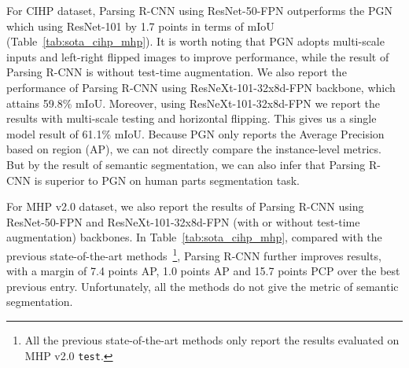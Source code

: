 \documentclass[10pt,twocolumn,letterpaper]{article}
\begin{document}
For CIHP dataset, Parsing R-CNN using ResNet-50-FPN outperforms the PGN~\cite{Gong_eccv2018_pgn} which using ResNet-101 by 1.7 points in terms of mIoU (Table~\ref{tab:sota_cihp_mhp}). It is worth noting that PGN adopts multi-scale inputs and left-right flipped images to improve performance, while the result of Parsing R-CNN is without test-time augmentation. We also report the performance of Parsing R-CNN using ResNeXt-101-32x8d-FPN backbone, which attains 59.8\% mIoU. Moreover, using ResNeXt-101-32x8d-FPN we report the results with multi-scale testing and horizontal flipping. This gives us a single model result of 61.1\% mIoU. Because PGN only reports the Average Precision based on region (AP), we can not directly compare the instance-level metrics. But by the result of semantic segmentation, we can also infer that Parsing R-CNN is superior to PGN on human parts segmentation task.

For MHP v2.0 dataset, we also report the results of Parsing R-CNN using ResNet-50-FPN and ResNeXt-101-32x8d-FPN (with or without test-time augmentation) backbones. In Table~\ref{tab:sota_cihp_mhp}, compared with the previous state-of-the-art methods~\cite{He_iccv2017_maskrcnn, Li_arxiv2017_mhparser, Zhao_mm2018_mhpv2}\footnote{\fontsize{7pt}{1em}All the previous state-of-the-art methods only report the results evaluated on MHP v2.0 \texttt{test}.}, Parsing R-CNN further improves results, with a margin of 7.4 points AP, 1.0 points AP and 15.7 points PCP over the best previous entry. Unfortunately, all the methods do not give the metric of semantic segmentation.





\begin{table}[t]
\centering
\small
{}
\vspace{.5em}
  \caption{2018 COCO Challenge results of Dense Pose Estimation task on \texttt{test}.}
  \label{tab:coco2018_densepose}
\vspace{-.8em}
\end{table}
\end{document}
